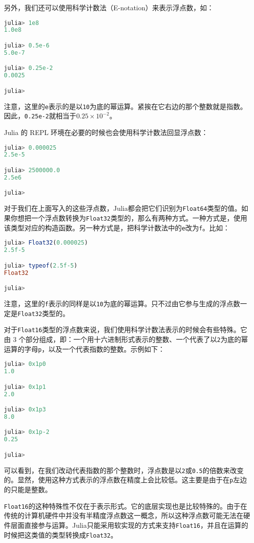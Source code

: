 另外，我们还可以使用科学计数法（E-notation）来表示浮点数，如：
\begin{lstlisting}[language=julia]
julia> 1e8
1.0e8

julia> 0.5e-6
5.0e-7

julia> 0.25e-2
0.0025

julia> 
\end{lstlisting}

注意，这里的\verb|e|表示的是以\verb|10|为底的幂运算。紧挨在它右边的那个整数就是指数。因此，\verb|0.25e-2|就相当于$0.25\times10^{-2}$。

Julia 的 REPL 环境在必要的时候也会使用科学计数法回显浮点数：
\begin{lstlisting}[language=julia]
julia> 0.000025
2.5e-5

julia> 2500000.0
2.5e6

julia> 
\end{lstlisting}

对于我们在上面写入的这些浮点数，Julia都会把它们识别为\verb|Float64|类型的值。如果你想把一个浮点数转换为\verb|Float32|类型的，那么有两种方式。一种方式是，使用该类型对应的构造函数。另一种方式是，把科学计数法中的\verb|e|改为\verb|f|。比如：
\begin{lstlisting}[language=julia]
julia> Float32(0.000025)
2.5f-5

julia> typeof(2.5f-5)
Float32

julia> 
\end{lstlisting}

注意，这里的\verb|f|表示的同样是以\verb|10|为底的幂运算。只不过由它参与生成的浮点数一定是\verb|Float32|类型的。

对于\verb|Float16|类型的浮点数来说，我们使用科学计数法表示的时候会有些特殊。它由 3 个部分组成，即：一个用十六进制形式表示的整数、一个代表了以\verb|2|为底的幂运算的字母\verb|p|，以及一个代表指数的整数。示例如下：
\begin{lstlisting}[language=julia]
julia> 0x1p0
1.0

julia> 0x1p1
2.0

julia> 0x1p3
8.0

julia> 0x1p-2
0.25

julia> 
\end{lstlisting}

可以看到，在我们改动代表指数的那个整数时，浮点数是以\verb|2|或\verb|0.5|的倍数来改变的。显然，使用这种方式表示的浮点数在精度上会比较低。这主要是由于在\verb|p|左边的只能是整数。

\verb|Float16|的这种特殊性不仅在于表示形式。它的底层实现也是比较特殊的。由于在传统的计算机硬件中并没有半精度浮点数这一概念，所以这种浮点数可能无法在硬件层面直接参与运算。Julia只能采用软实现的方式来支持\verb|Float16|，并且在运算的时候把这类值的类型转换成\verb|Float32|。

